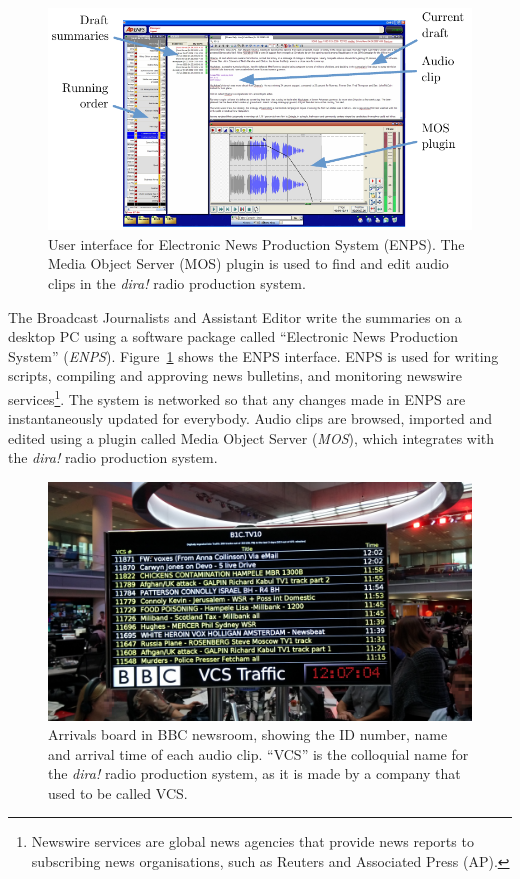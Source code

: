\begin{figure}
  \centering
  \includegraphics[width=\columnwidth]{figs/news-enps-labelled.pdf}
  \caption{User interface for Electronic News Production System (ENPS). The Media Object Server (MOS) plugin is used to
  find and edit audio clips in the \textit{dira!} radio production system.}
  \label{fig:news-enps-edit}
\end{figure}

The Broadcast Journalists and Assistant Editor write the summaries on a desktop PC using a software package called
``Electronic News Production System'' (\textit{ENPS}). Figure~\ref{fig:news-enps-edit} shows the ENPS interface. ENPS
is used for writing scripts, compiling and approving news bulletins, and monitoring newswire services\footnote{Newswire
services are global news agencies that provide news reports to subscribing news organisations, such as Reuters and
Associated Press (AP).}. The system is networked so that any changes made in ENPS are instantaneously updated for
everybody. Audio clips are browsed, imported and edited using a plugin called Media Object Server (\textit{MOS}), which
integrates with the \textit{dira!} radio production system.

\begin{figure}
  \centering
  \includegraphics[width=\columnwidth]{figs/news-intake-pixelated.jpg}
  \caption{Arrivals board in BBC newsroom, showing the ID number, name and arrival time of each audio clip.  ``VCS'' is
  the colloquial name for the \textit{dira!} radio production system, as it is made by a company that used to be called
VCS.}
  \label{fig:news-arrivals}
\end{figure}

